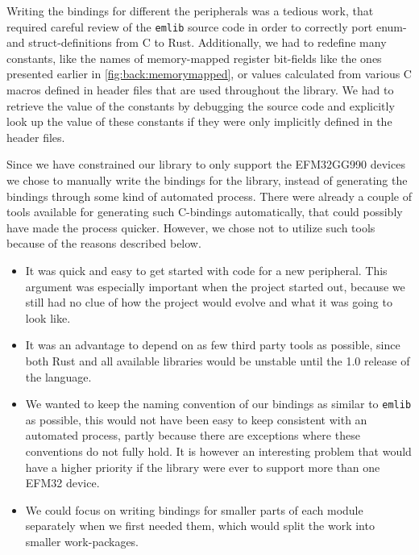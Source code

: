 
Writing the bindings for different the peripherals was a tedious work, that required careful review of the \texttt{emlib} source code in order to correctly port enum- and struct-definitions from C to Rust.
Additionally, we had to redefine many constants, like the names of memory-mapped register bit-fields like the ones presented earlier in \autoref{fig:back:memorymapped}, or values calculated from various C macros defined in header files that are used throughout the library.
We had to retrieve the value of the constants by debugging the source code and explicitly look up the value of these constants if they were only implicitly defined in the header files.

Since we have constrained our library to only support the EFM32GG990 devices we chose to manually write the bindings for the library, instead of generating the bindings through some kind of automated process.
There were already a couple of tools available for generating such C-bindings automatically, that could possibly have made the process quicker.
However, we chose not to utilize such tools because of the reasons described below.

\begin{itemize}
    \item It was quick and easy to get started with code for a new peripheral.
    This argument was especially important when the project started out, because we still had no clue of how the project would evolve and what it was going to look like.

    \item It was an advantage to depend on as few third party tools as possible, since both Rust and all available libraries would be unstable until the 1.0 release of the language.

    \item We wanted to keep the naming convention of our bindings as similar to \texttt{emlib} as possible, this would not have been easy to keep consistent with an automated process, partly because there are exceptions where these conventions do not fully hold.
    It is however an interesting problem that would have a higher priority if the library were ever to support more than one EFM32 device.

    \item We could focus on writing bindings for smaller parts of each module separately when we first needed them, which would split the work into smaller work-packages.
\end{itemize}
